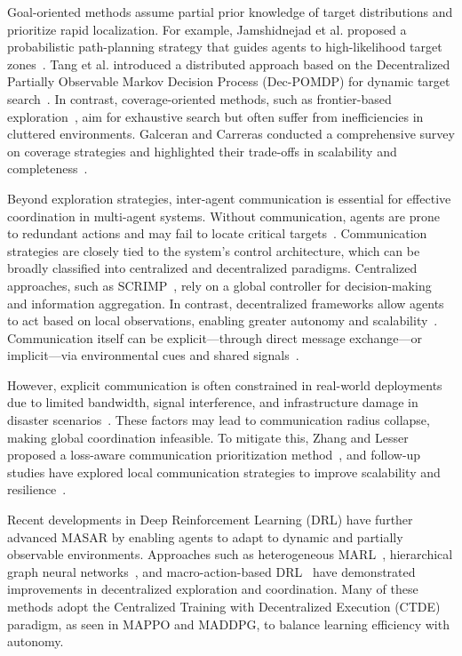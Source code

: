 \documentclass[lettersize,journal]{IEEEtran}
\begin{document}
Goal-oriented methods assume partial prior knowledge of target distributions and prioritize rapid localization. For example, Jamshidnejad et al. proposed a probabilistic path-planning strategy that guides agents to high-likelihood target zones~\cite{jamshidnejad2018adaptive}. Tang et al. introduced a distributed approach based on the Decentralized Partially Observable Markov Decision Process (Dec-POMDP) for dynamic target search~\cite{tang2007complete}. In contrast, coverage-oriented methods, such as frontier-based exploration~\cite{yamauchi1998frontier}, aim for exhaustive search but often suffer from inefficiencies in cluttered environments. Galceran and Carreras conducted a comprehensive survey on coverage strategies and highlighted their trade-offs in scalability and completeness~\cite{galceran2013survey}.

Beyond exploration strategies, inter-agent communication is essential for effective coordination in multi-agent systems. Without communication, agents are prone to redundant actions and may fail to locate critical targets~\cite{sun2025multi, peter2021modern}. Communication strategies are closely tied to the system's control architecture, which can be broadly classified into centralized and decentralized paradigms. Centralized approaches, such as SCRIMP~\cite{wang2023scrimp}, rely on a global controller for decision-making and information aggregation. In contrast, decentralized frameworks allow agents to act based on local observations, enabling greater autonomy and scalability~\cite{dutta2021opportunistic}. Communication itself can be explicit—through direct message exchange—or implicit—via environmental cues and shared signals~\cite{farinelli2004multirobot, gielis2022critical}.

However, explicit communication is often constrained in real-world deployments due to limited bandwidth, signal interference, and infrastructure damage in disaster scenarios~\cite{ghena2019challenge,drew2021multi}. These factors may lead to communication radius collapse, making global coordination infeasible. To mitigate this, Zhang and Lesser proposed a loss-aware communication prioritization method~\cite{zhang2013coordinating}, and follow-up studies have explored local communication strategies to improve scalability and resilience~\cite{grupen2020low}.

Recent developments in Deep Reinforcement Learning (DRL) have further advanced MASAR by enabling agents to adapt to dynamic and partially observable environments. Approaches such as heterogeneous MARL~\cite{wakilpoor2020heterogeneous}, hierarchical graph neural networks~\cite{zhang2022h2gnn}, and macro-action-based DRL~\cite{tan2022deep} have demonstrated improvements in decentralized exploration and coordination. Many of these methods adopt the Centralized Training with Decentralized Execution (CTDE) paradigm, as seen in MAPPO and MADDPG, to balance learning efficiency with autonomy.
\end{document}
